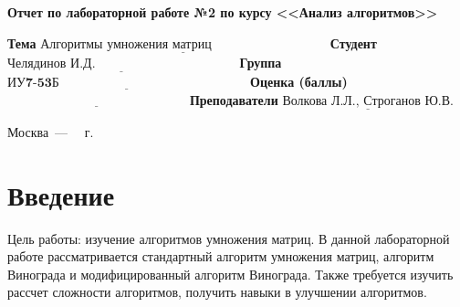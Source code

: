 \documentclass[12pt]{report}
\begin{document}
\begin{titlepage}
	\begin{center}
		\Large\textbf{Отчет по лабораторной работе №2 по курсу <<Анализ алгоритмов>>}
	\end{center}
	\newline\newline 
	\newline
	
	\noindent\textbf{Тема} $\underline{\textbf{Алгоритмы умножения матриц~~~~~~~~~~~~~~~~~~~~~~~~~~~}}$\newline\newline
	\noindent\textbf{Студент} $\underline{\textbf{Челядинов И.Д.~~~~~~~~~~~~~~~~~~~~~~~~~~~~~~~~~}}$\newline\newline
	\noindent\textbf{Группа} $\underline{\textbf{ИУ7-53Б~~~~~~~~~~~~~~~~~~~~~~~~~~~~~~~~~~~~~~~~~~~~}}$\newline\newline
	\noindent\textbf{Оценка (баллы)} $\underline{\textbf{~~~~~~~~~~~~~~~~~~~~~~~~~~~~~~~~~~~~~~~~~~}}$\newline\newline
	\noindent\textbf{Преподаватели} $\underline{\textbf{Волкова Л.Л., Строганов Ю.В.}}$\newline
	
	\begin{center}
		\vfill
		Москва~---~\the\year
		~г.
	\end{center}
 \restoregeometry
\end{titlepage}


\tableofcontents
\newpage
\chapter*{Введение}
Цель работы: изучение алгоритмов умножения матриц. В данной лабораторной работе рассматривается стандартный алгоритм умножения матриц, алгоритм Винограда и модифицированный алгоритм Винограда.  Также требуется изучить рассчет сложности алгоритмов, получить навыки в улучшении алгоритмов.
\end{document}
